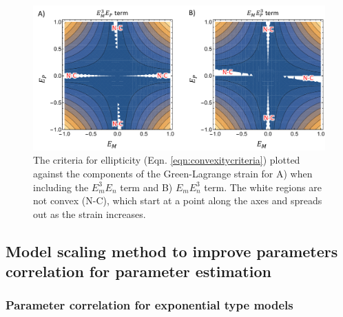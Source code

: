 \begin{figure}
\centering
\includegraphics[width=\textwidth]{Images/chapter5/convexitybehavior}
\caption{The criteria for ellipticity (Eqn. \ref{eqn:convexitycriteria}) plotted against the components of the Green-Lagrange strain for A) when including the $E_m^3E_n$ term and B) $E_mE_n^3$ term. The white regions are not convex (N-C), which start at a point along the axes and spreads out as the strain increases.}
\label{fig:convexitybehavior}
\end{figure}










    
\subsection{Model scaling method to improve parameters correlation for parameter estimation} \label{sec:modelscaling}

\subsubsection{Parameter correlation for exponential type models}

